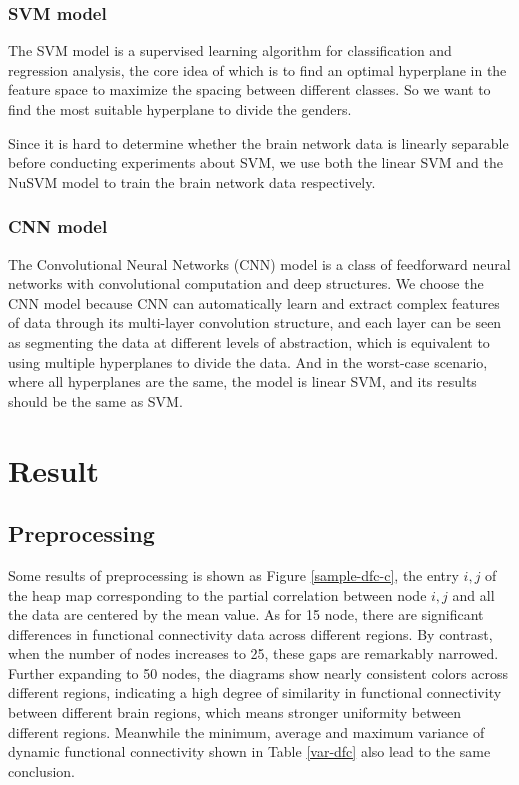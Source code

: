 \documentclass[11pt]{article}
\begin{document}
\subsubsection{SVM model}

The SVM model\cite{Vapnik1997-yy}\cite{Cortes1995-dg} is a supervised learning algorithm for classification and regression analysis, the core idea of which is to find an optimal hyperplane in the feature space to maximize the spacing between different classes. So we want to find the most suitable hyperplane to divide the genders.

Since it is hard to determine whether the brain network data is linearly separable before conducting experiments about SVM, we use both the linear SVM and the NuSVM model to train the brain network data respectively.

\subsubsection{CNN model}

The Convolutional Neural Networks (CNN) model is a class of feedforward neural networks with convolutional computation and deep structures. We choose the CNN model because CNN can automatically learn and extract complex features of data through its multi-layer convolution structure, and each layer can be seen as segmenting the data at different levels of abstraction, which is equivalent to using multiple hyperplanes to divide the data. And in the worst-case scenario, where all hyperplanes are the same, the model is linear SVM, and its results should be the same as SVM.

\section{Result}

\subsection{Preprocessing}

Some results of preprocessing is shown as Figure \ref{sample-dfc-c}, the entry $i,j$ of the heap map corresponding to the partial correlation between node $i,j$ and all the data are centered by the mean value. As for 15 node, there are significant differences in functional connectivity data across different regions. By contrast, when the number of nodes increases to 25, these gaps are remarkably narrowed. Further expanding to 50 nodes, the diagrams show nearly consistent colors across different regions, indicating a high degree of similarity in functional connectivity between different brain regions, which means stronger uniformity between different regions. Meanwhile the minimum, average and maximum variance of dynamic functional connectivity shown in Table \ref{var-dfc} also lead to the same conclusion.
\end{document}
